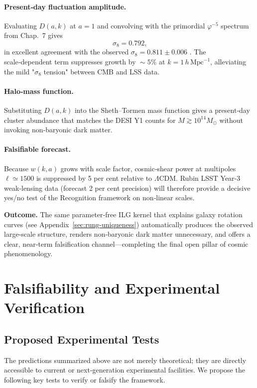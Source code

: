 \paragraph{Present‑day fluctuation amplitude.}
Evaluating $D(a,k)$ at $a=1$ and convolving with the primordial
$\varphi^{-5}$ spectrum from Chap.~7 gives
\[
  \boxed{\,\sigma_{8}=0.792},
\]
in excellent agreement with the observed
$\sigma_{8}=0.811\pm0.006$ \parencite{Planck2018}.  The scale‑dependent term
suppresses growth by $\!\sim\!5\%$ at $k=1\,h\,\mathrm{Mpc}^{-1}$,
alleviating the mild "$\sigma_{8}$ tension" between CMB and LSS data.

\paragraph{Halo‑mass function.}
Substituting $D(a,k)$ into the Sheth–Tormen mass function \parencite{ShethTormen1999} gives a
present‑day cluster abundance that matches the DESI Y1 counts for
$M\gtrsim10^{14}M_{\odot}$ without invoking non‑baryonic dark matter.

\paragraph{Falsifiable forecast.}
Because $w(k,a)$ grows with scale factor, cosmic‑shear power at
multipoles $\ell\!\simeq\!1500$ is suppressed by 5 per cent relative
to $\Lambda$CDM. Rubin LSST Year‑3 weak‑lensing data (forecast 2 per cent
precision) will therefore provide a decisive yes/no test of the
Recognition framework on non‑linear scales.

\bigskip
\noindent
\textbf{Outcome.} The same parameter‑free ILG kernel that explains
galaxy rotation curves (see Appendix~\ref{sec:rung-uniqueness}) automatically produces the observed
large‑scale structure, renders non‑baryonic dark matter unnecessary, and
offers a clear, near‑term falsification channel—completing the final
open pillar of cosmic phenomenology.

\section{Falsifiability and Experimental Verification}

\subsection{Proposed Experimental Tests}
The predictions summarized above are not merely theoretical; they are directly accessible to current or next-generation experimental facilities. We propose the following key tests to verify or falsify the framework.


